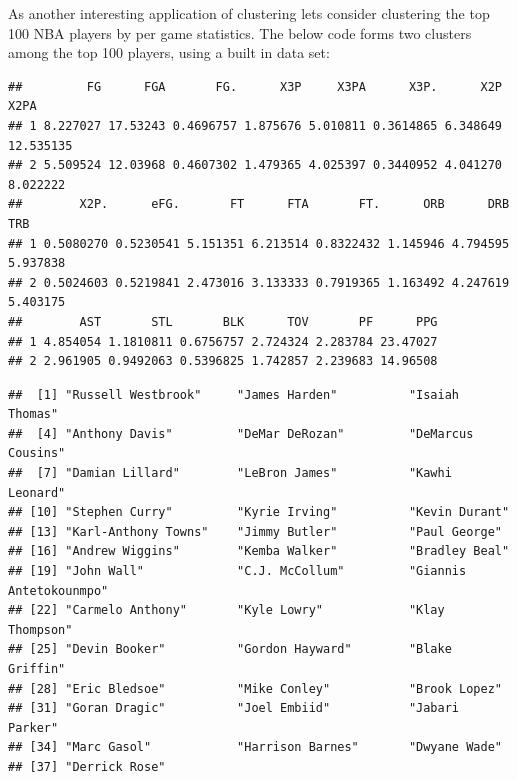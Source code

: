 \documentclass[
]{book}
\newenvironment{Shaded}{\begin{snugshade}}{\end{snugshade}}
\newcommand{\AttributeTok}[1]{\textcolor[rgb]{0.77,0.63,0.00}{#1}}
\newcommand{\DecValTok}[1]{\textcolor[rgb]{0.00,0.00,0.81}{#1}}
\newcommand{\DocumentationTok}[1]{\textcolor[rgb]{0.56,0.35,0.01}{\textbf{\textit{#1}}}}
\newcommand{\FunctionTok}[1]{\textcolor[rgb]{0.00,0.00,0.00}{#1}}
\newcommand{\NormalTok}[1]{#1}
\newcommand{\OtherTok}[1]{\textcolor[rgb]{0.56,0.35,0.01}{#1}}
\newcommand{\SpecialCharTok}[1]{\textcolor[rgb]{0.00,0.00,0.00}{#1}}
\newcommand{\StringTok}[1]{\textcolor[rgb]{0.31,0.60,0.02}{#1}}
\theoremstyle{definition}
\theoremstyle{definition}
\theoremstyle{definition}
\theoremstyle{definition}
\theoremstyle{remark}
\begin{document}
As another interesting application of clustering lets consider clustering the top 100 NBA players by per game statistics. The below code forms two clusters among the top 100 players, using a built in data set:

\begin{Shaded}
\end{Shaded}

\begin{verbatim}
##         FG      FGA       FG.      X3P     X3PA      X3P.      X2P      X2PA
## 1 8.227027 17.53243 0.4696757 1.875676 5.010811 0.3614865 6.348649 12.535135
## 2 5.509524 12.03968 0.4607302 1.479365 4.025397 0.3440952 4.041270  8.022222
##        X2P.      eFG.       FT      FTA       FT.      ORB      DRB      TRB
## 1 0.5080270 0.5230541 5.151351 6.213514 0.8322432 1.145946 4.794595 5.937838
## 2 0.5024603 0.5219841 2.473016 3.133333 0.7919365 1.163492 4.247619 5.403175
##        AST       STL       BLK      TOV       PF      PPG
## 1 4.854054 1.1810811 0.6756757 2.724324 2.283784 23.47027
## 2 2.961905 0.9492063 0.5396825 1.742857 2.239683 14.96508
\end{verbatim}

\begin{Shaded}
\end{Shaded}

\begin{verbatim}
##  [1] "Russell Westbrook"     "James Harden"          "Isaiah Thomas"        
##  [4] "Anthony Davis"         "DeMar DeRozan"         "DeMarcus Cousins"     
##  [7] "Damian Lillard"        "LeBron James"          "Kawhi Leonard"        
## [10] "Stephen Curry"         "Kyrie Irving"          "Kevin Durant"         
## [13] "Karl-Anthony Towns"    "Jimmy Butler"          "Paul George"          
## [16] "Andrew Wiggins"        "Kemba Walker"          "Bradley Beal"         
## [19] "John Wall"             "C.J. McCollum"         "Giannis Antetokounmpo"
## [22] "Carmelo Anthony"       "Kyle Lowry"            "Klay Thompson"        
## [25] "Devin Booker"          "Gordon Hayward"        "Blake Griffin"        
## [28] "Eric Bledsoe"          "Mike Conley"           "Brook Lopez"          
## [31] "Goran Dragic"          "Joel Embiid"           "Jabari Parker"        
## [34] "Marc Gasol"            "Harrison Barnes"       "Dwyane Wade"          
## [37] "Derrick Rose"
\end{verbatim}
\end{document}
